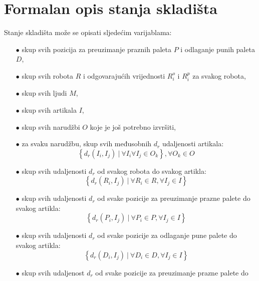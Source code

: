 \documentclass[times, utf8, seminar]{fer}
\begin{document}
\section{Formalan opis stanja skladišta}
Stanje skladišta može se opisati sljedećim varijablama:
\begin{itemize}
    \item[$\bullet$] skup svih pozicija za preuzimanje praznih paleta $P$ i odlaganje punih paleta $D$,
    \item[$\bullet$] skup svih robota $R$ i odgovarajućih vrijednosti $R_{i}^{o}$ i $R_{i}^{p}$ za svakog robota,
    \item[$\bullet$] skup svih ljudi $M$,
    \item[$\bullet$] skup svih artikala $I$,
    \item[$\bullet$] skup svih narudžbi $O$ koje je još potrebno izvršiti,
    \item[$\bullet$] za svaku narudžbu, skup svih međusobnih $d_r$ udaljenosti artikala:
                \begin{equation}
                \label{state-set-01}
                    \left\{ d_r(I_i, I_j)\ |\ \forall I_i \forall I_j \in O_k \right\}, \forall O_k \in O
                \end{equation}
    \item[$\bullet$] skup svih udaljenosti $d_r$ od svakog robota do svakog artikla:
                \begin{equation}
                \label{state-set-02}
                    \left\{ d_r(R_i, I_j)\ |\ \forall R_i \in R, \forall I_j \in I\right\}
                \end{equation}
    \item[$\bullet$] skup svih udaljenosti $d_r$ od svake pozicije za preuzimanje prazne palete do
                     svakog artikla:
                \begin{equation}
                    \left\{d_r(P_i, I_j)\ |\ \forall P_i \in P, \forall I_j \in I\right\}
                \end{equation}
    \item[$\bullet$] skup svih udaljenosti $d_r$ od svake pozicije za odlaganje pune palete do
                     svakog artikla:
                \begin{equation}
                    \left\{d_r(D_i, I_j)\ |\ \forall D_i \in D, \forall I_j \in I\right\}
                \end{equation}
    \item[$\bullet$] skup svih udaljenost $d_r$ od svake pozicije za preuzimanje prazne palete do

\end{itemize}
\end{document}
